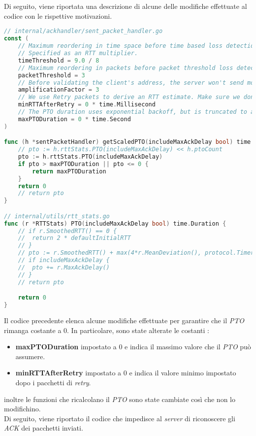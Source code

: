 \\\\
Di seguito, viene riportata una descrizione di alcune delle modifiche effettuate al codice con le rispettive motivazioni.
\begin{lstlisting}[language=Go]
// internal/ackhandler/sent_packet_handler.go
const (
	// Maximum reordering in time space before time based loss detection considers a packet lost.
	// Specified as an RTT multiplier.
	timeThreshold = 9.0 / 8
	// Maximum reordering in packets before packet threshold loss detection considers a packet lost.
	packetThreshold = 3
	// Before validating the client's address, the server won't send more than 3x bytes than it received.
	amplificationFactor = 3
	// We use Retry packets to derive an RTT estimate. Make sure we don't set the RTT to a super low value yet.
	minRTTAfterRetry = 0 * time.Millisecond 
	// The PTO duration uses exponential backoff, but is truncated to a maximum value, as allowed by RFC 8961, section 4.4.
	maxPTODuration = 0 * time.Second 
)

func (h *sentPacketHandler) getScaledPTO(includeMaxAckDelay bool) time.Duration {
	// pto := h.rttStats.PTO(includeMaxAckDelay) << h.ptoCount
	pto := h.rttStats.PTO(includeMaxAckDelay)
	if pto > maxPTODuration || pto <= 0 {
		return maxPTODuration
	}
	return 0
	// return pto
}

// internal/utils/rtt_stats.go
func (r *RTTStats) PTO(includeMaxAckDelay bool) time.Duration {
	// if r.SmoothedRTT() == 0 {
	// 	return 2 * defaultInitialRTT
	// }
	// pto := r.SmoothedRTT() + max(4*r.MeanDeviation(), protocol.TimerGranularity)
	// if includeMaxAckDelay {
	// 	pto += r.MaxAckDelay()
	// }
	// return pto

	return 0
}
\end{lstlisting}
\noindent Il codice precedente elenca alcune modifiche effettuate per garantire che il \emph{PTO} rimanga costante a 0. 
In particolare, sono state alterate le costanti : 
\begin{itemize}
    \item \textbf{maxPTODuration} impostato a 0 e indica il massimo valore che il \emph{PTO} può assumere. 
    \item \textbf{minRTTAfterRetry} impostato a 0 e indica il valore minimo impostato dopo i pacchetti di \emph{retry}.
\end{itemize}
\noindent inoltre le funzioni che ricalcolano il \emph{PTO} sono state cambiate così che non lo modifichino.
\\
Di seguito, viene riportato il codice che impedisce al \emph{server} di riconoscere gli \emph{ACK} dei pacchetti inviati. 
